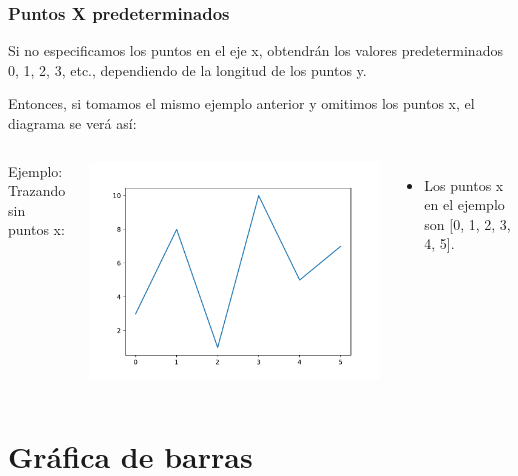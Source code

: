 \begin{frame}[fragile]
  \frametitle{Puntos X predeterminados}
  Si no especificamos los puntos en el eje x, obtendrán los
  valores predeterminados 0, 1, 2, 3, etc., dependiendo de la
  longitud de los puntos y.

  Entonces, si tomamos el mismo ejemplo anterior y omitimos los
  puntos x, el diagrama se verá así:
  \begin{columns}
        \begin{exampleblock}{Ejemplo:}
          Trazando sin puntos x:
          
        \end{exampleblock}
      \pausa
      \begin{center}
          \includegraphics[scale=0.3]{ejemplos/e05.pdf}
      \end{center}
      \begin{itemize}
        \item Los puntos x en el ejemplo son [0, 1, 2, 3, 4, 5].
      \end{itemize}
  \end{columns}
\end{frame}

\section{Gráfica de barras}


